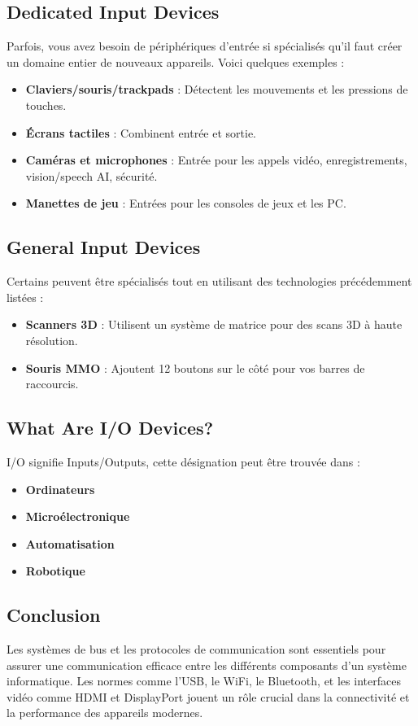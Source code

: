 \documentclass[10pt,a4paper]{article}
\begin{document}
\subsection*{Dedicated Input Devices}
Parfois, vous avez besoin de périphériques d'entrée si spécialisés qu'il faut créer un domaine entier de nouveaux appareils. Voici quelques exemples :
\begin{itemize}
    \item \textbf{Claviers/souris/trackpads} : Détectent les mouvements et les pressions de touches.
    \item \textbf{Écrans tactiles} : Combinent entrée et sortie.
    \item \textbf{Caméras et microphones} : Entrée pour les appels vidéo, enregistrements, vision/speech AI, sécurité.
    \item \textbf{Manettes de jeu} : Entrées pour les consoles de jeux et les PC.
\end{itemize}

\subsection*{General Input Devices}
Certains peuvent être spécialisés tout en utilisant des technologies précédemment listées :
\begin{itemize}
    \item \textbf{Scanners 3D} : Utilisent un système de matrice pour des scans 3D à haute résolution.
    \item \textbf{Souris MMO} : Ajoutent 12 boutons sur le côté pour vos barres de raccourcis.
\end{itemize}

\subsection*{What Are I/O Devices?}
I/O signifie Inputs/Outputs, cette désignation peut être trouvée dans :
\begin{itemize}
    \item \textbf{Ordinateurs}
    \item \textbf{Microélectronique}
    \item \textbf{Automatisation}
    \item \textbf{Robotique}
\end{itemize}

\subsection*{Conclusion}
Les systèmes de bus et les protocoles de communication sont essentiels pour assurer une communication efficace entre les différents composants d'un système informatique. Les normes comme l'USB, le WiFi, le Bluetooth, et les interfaces vidéo comme HDMI et DisplayPort jouent un rôle crucial dans la connectivité et la performance des appareils modernes.
\end{document}
